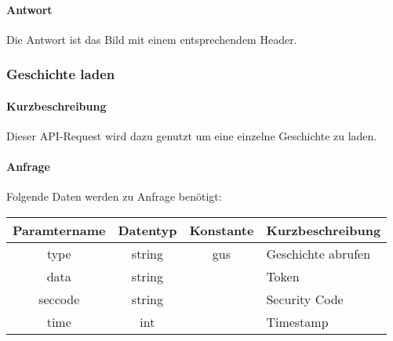 \paragraph{Antwort}Die Antwort ist das Bild mit einem entsprechendem Header.

\subsubsection{Geschichte laden}
\paragraph{Kurzbeschreibung}Dieser API-Request wird dazu genutzt um eine einzelne Geschichte zu laden.
\paragraph{Anfrage}Folgende Daten werden zu Anfrage benötigt:
\begin{table}[H]
	\begin{tabular}{|c|c|c|p{6.5cm}|}
		\hline
		\textbf{Paramtername} & \textbf{Datentyp} & \textbf{Konstante} & \textbf{Kurzbeschreibung}                                                                                               \\ \hline
		type                & string            & gus                & Geschichte abrufen \\ \hline
		data                & string            &                    & Token \\ \hline
		seccode             & string            &                    & Security Code \\ \hline
		time                & int               &                    & Timestamp \\ \hline
	\end{tabular}
\end{table}
